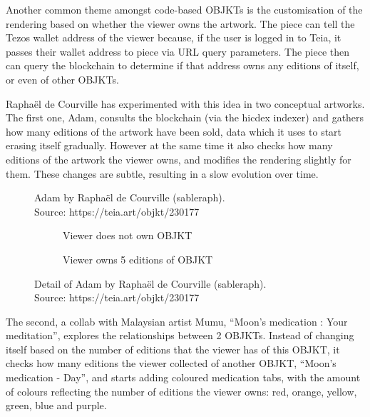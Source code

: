 Another common theme amongst code-based OBJKTs is the customisation of the rendering based on whether the viewer owns the artwork. The piece can tell the Tezos wallet address of the viewer because, if the user is logged in to Teia, it passes their wallet address to piece via URL query parameters. The piece then can query the blockchain to determine if that address owns any editions of itself, or even of other OBJKTs.

Raphaël de Courville has experimented with this idea in two conceptual artworks. The first one, Adam, consults the blockchain (via the hicdex indexer) and gathers how many editions of the artwork have been sold, data which it uses to start erasing itself gradually. However at the same time it also checks how many editions of the artwork the viewer owns, and modifies the rendering slightly for them. These changes are subtle, resulting in a slow evolution over time.

\begin{figure}[h]
    \centering
    \captionsetup{justification=centering}
    \captionsetup{justification=centering}
    \caption[Adam by Raphaël de Courville (sableraph)]{Adam by Raphaël de Courville (sableraph). \\ Source: https://teia.art/objkt/230177}
    \label{fig:mondrian}
\end{figure}


\begin{figure}[H]
  \centering
  \captionsetup{justification=centering}
  \begin{subfigure}[b]{0.45\textwidth}
    \centering
    \caption{Viewer does not own OBJKT}
    \label{fig:adam-no-own}
  \end{subfigure}
  \hfill
  \begin{subfigure}[b]{0.45\textwidth}
    \centering
    \caption{Viewer owns 5 editions of OBJKT}
    \label{fig:adam-own}
  \end{subfigure}
  \caption{Detail of Adam by Raphaël de Courville (sableraph). \\ Source: https://teia.art/objkt/230177}
  \label{fig:vdp-examples}
\end{figure}

The second, a collab with Malaysian artist Mumu, ``Moon's medication : Your meditation'', explores the relationships between 2 OBJKTs. Instead of changing itself based on the number of editions that the viewer has of this OBJKT, it checks how many editions the viewer collected of another OBJKT, ``Moon's medication - Day'', and starts adding coloured medication tabs, with the amount of colours reflecting the number of editions the viewer owns: red, orange, yellow, green, blue and purple.

